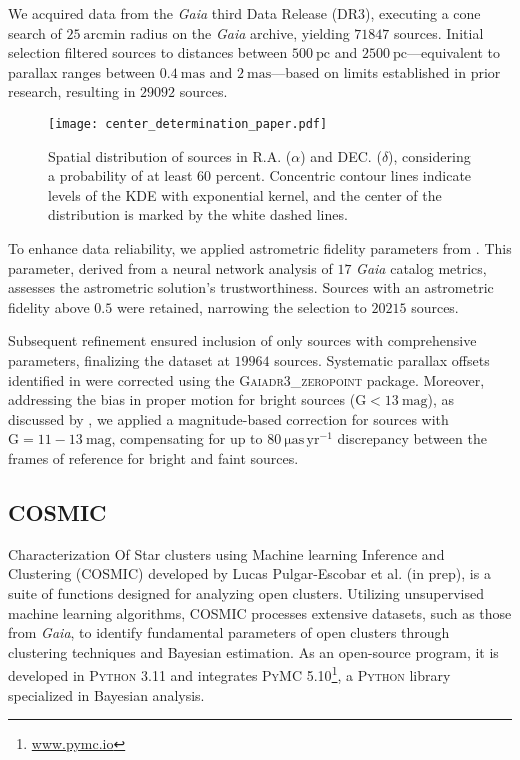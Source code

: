 \documentclass[baaa]{baaa}
\begin{document}
We acquired data from the \textit{Gaia} third Data Release (DR3), executing a cone search of $25~\mathrm{arcmin}$ radius on the \textit{Gaia} archive, yielding $71847$ sources. Initial selection filtered sources to distances between $500~\mathrm{pc}$ and $2500~\mathrm{pc}$—equivalent to parallax ranges between $0.4~\mathrm{mas}$ and $2~\mathrm{mas}$—based on limits established in prior research, resulting in $29092$ sources.

\begin{figure}
    \centering
    \texttt{[image: center\_determination\_paper.pdf]}
    \caption{Spatial distribution of sources in R.A. ($\alpha$) and DEC. ($\delta$), considering a probability of at least $60$ percent. Concentric contour lines indicate levels of the KDE with exponential kernel, and the center of the distribution is marked by the white dashed lines.}
    \label{fig:center}
\end{figure}

To enhance data reliability, we applied astrometric fidelity parameters from \cite{2022MNRAS.510.2597R}. This parameter, derived from a neural network analysis of $17$ \textit{Gaia} catalog metrics, assesses the astrometric solution's trustworthiness. Sources with an astrometric fidelity above $0.5$ were retained, narrowing the selection to $20215$ sources.

Subsequent refinement ensured inclusion of only sources with comprehensive parameters, finalizing the dataset at $19964$ sources. Systematic parallax offsets identified in \citet{2021A&A...649A...2L} were corrected using the \textsc{Gaiadr3\_zeropoint} package. Moreover, addressing the bias in proper motion for bright sources ($\mathrm{G}<13~\mathrm{mag}$), as discussed by \citet{2021A&A...649A.124C}, we applied a magnitude-based correction for sources with $\mathrm{G} = 11-13~\mathrm{mag}$, compensating for up to $80~\mathrm{\mu as\,yr^{-1}}$ discrepancy between the frames of reference for bright and faint sources.

\subsection{\sc COSMIC}

Characterization Of Star clusters using Machine learning Inference and Clustering (\textsc{COSMIC}) developed by Lucas Pulgar-Escobar et al. (in prep), is a suite of functions designed for analyzing open clusters. Utilizing unsupervised machine learning algorithms, \textsc{COSMIC} processes extensive datasets, such as those from \textit{Gaia}, to identify fundamental parameters of open clusters through clustering techniques and Bayesian estimation. As an open-source program, it is developed in \textsc{Python} 3.11 and integrates \textsc{PyMC} 5.10\footnote{\url{www.pymc.io}}, a \textsc{Python} library specialized in Bayesian analysis.
\end{document}

